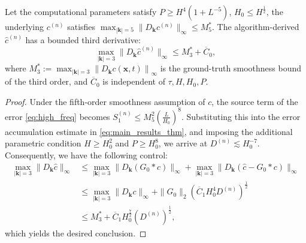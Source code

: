 \documentclass[review,onefignum,onetabnum]{siamart250211}
\begin{document}
\begin{corollary}
\label{cor:c_hat_2norm_reg}
Let the computational parameters satisfy \( P \geq H^4(1+L^{-5}) \), \( H_0 \leq H^{\frac{1}{2}} \), the underlying $c^{(n)}$ satisfies $\max_{|\mathbf{k}|= 5}\| D_{\mathbf{k}} c^{(n)}\|_\infty \leq M_5^*$. The algorithm-derived \(\hat{c}^{(n)}\) has a bounded third derivative:
\begin{equation}
\max_{|\mathbf{k}|= 3}\| D_{\mathbf{k}} \hat{c}^{(n)}\|_\infty \leq M_3^*+\overline{C}_0,
\end{equation}
where $M_3^* := \max_{|\mathbf{k}|= 3}
\left\|D_{\mathbf{k}}c(\mathbf{x},t)\right\|_\infty$ is the ground-truth smoothness bound of the third order, and $\overline{C}_0$ is independent of \(\tau,H,H_0,P\).   
\end{corollary}
\begin{proof}
Under the fifth-order smoothness assumption of $c$, the source term of the error \eqref{eq:high_freq} becomes $S_1^{(n)}\leq M_5^2\left(\frac{L}{H_0}\right)^8$. Substituting this into the error accumulation estimate in \eqref{eq:main_results_thm}, and imposing the additional parametric condition $H\geq H_0^2$ and $P \geq H_0^8$, we arrive at $D^{(n)} \lesssim H_0^{-7}.$ Consequently, we have the following control:
\begin{equation}
\begin{aligned}
\max_{|\mathbf{k}|= 3}\| D_{\mathbf{k}} \hat{c} \|_\infty &\leq \max_{|\mathbf{k}|= 3}\| D_{\mathbf{k}} (G_0 \ast c) \|_\infty +\max_{|\mathbf{k}|= 3}\| D_{\mathbf{k}} (\hat{c} -G_0 \ast c) \|_\infty\\
&\leq \max_{|\mathbf{k}|= 3}\| D_{\mathbf{k}} c \|_\infty + \|G_0\|_2\left(\overline{C}_1 H_0^4D^{(n)}\right)^\frac{1}{2}\\
&\leq M_3^* +\overline{C}_1 H_0^\frac{7}{2} \left(D^{(n)}\right)^\frac{1}{2},
\end{aligned}
\end{equation}
which yields the desired conclusion.
\end{proof}
\end{document}
